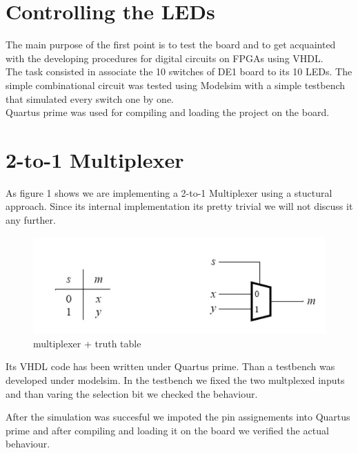 \documentclass[12pt]{article}
\begin{document}

\section{ Controlling the LEDs }

The main purpose of the first point is to test the board and to get acquainted with the developing procedures for digital circuits on FPGAs using VHDL.\\
The task consisted in associate the 10 switches of DE1 board to its 10 LEDs.
The simple combinational circuit was tested using Modelsim with a simple testbench that simulated every switch one by one.\\
Quartus prime was used for compiling and loading the project on the board.
\section{2-to-1 Multiplexer}
As figure 1 shows we are implementing a 2-to-1 Multiplexer using a stuctural approach. Since its internal implementation its pretty trivial we will not discuss it any further.

\begin{figure}[h]
	\centering
	\includegraphics[scale = 0.5]{image2.jpg}
	\caption{multiplexer + truth table}
\end{figure}

Its VHDL code has been written under Quartus prime. Than a testbench was developed under modelsim. In the testbench we fixed the two multplexed inputs and than varing the selection bit we checked the behaviour.

After the simulation was succesful we impoted the pin assignements into Quartus prime and after compiling and loading it on the board we verified the actual behaviour.
\\\\
\end{document}
